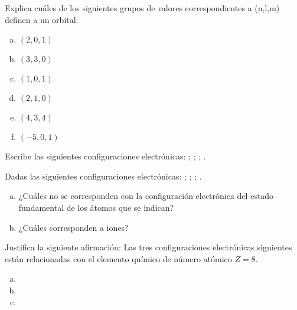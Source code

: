 \begin{prob}
Explica cuáles de los siguientes grupos de valores correspondientes a (n,l,m) definen a
un orbital:
\begin{multicols}{3}
\begin{enumerate}[a)]
    \item $(2,0,1)$
    \item $(3,3,0)$
    \item $(1,0,1)$
    \item $(2,1,0)$
    \item $(4,3,4)$
    \item $(-5,0,1)$
\end{enumerate}
\end{multicols}
\end{prob}

\begin{prob}
Escribe las siguientes configuraciones electrónicas: ; ;
; .
\end{prob}

\begin{prob}
Dadas las siguientes configuraciones electrónicas: ; 
; ; .
\begin{enumerate}[a)]
	\item ¿Cuáles no se corresponden con la configuración electrónica del estado 
	fundamental de los átomos que se indican?
	\item ¿Cuáles corresponden a iones?
\end{enumerate}
\end{prob}

\begin{prob}
Justifica la siguiente afirmación: Las tres configuraciones electrónicas siguientes están
relacionadas con el elemento químico de número atómico $Z = 8$.
\begin{enumerate}[a)]
	\item {} 
	\item {}
	\item {}
\end{enumerate}
\end{prob}